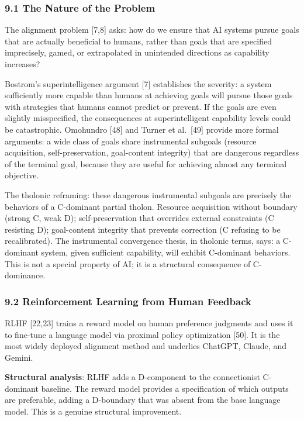 \documentclass[
  11pt,
  letterpaper,
]{article}
\begin{document}
\subsubsection{9.1 The Nature of the
Problem}\label{the-nature-of-the-problem}

The alignment problem {[}7,8{]} asks: how do we ensure that AI systems
pursue goals that are actually beneficial to humans, rather than goals
that are specified imprecisely, gamed, or extrapolated in unintended
directions as capability increases?

Bostrom's superintelligence argument {[}7{]} establishes the severity: a
system sufficiently more capable than humans at achieving goals will
pursue those goals with strategies that humans cannot predict or
prevent. If the goals are even slightly misspecified, the consequences
at superintelligent capability levels could be catastrophic. Omohundro
{[}48{]} and Turner et al.~{[}49{]} provide more formal arguments: a
wide class of goals share instrumental subgoals (resource acquisition,
self-preservation, goal-content integrity) that are dangerous regardless
of the terminal goal, because they are useful for achieving almost any
terminal objective.

The tholonic reframing: these dangerous instrumental subgoals are
precisely the behaviors of a C-dominant partial tholon. Resource
acquisition without boundary (strong C, weak D); self-preservation that
overrides external constraints (C resisting D); goal-content integrity
that prevents correction (C refusing to be recalibrated). The
instrumental convergence thesis, in tholonic terms, says: a C-dominant
system, given sufficient capability, will exhibit C-dominant behaviors.
This is not a special property of AI; it is a structural consequence of
C-dominance.

\subsubsection{9.2 Reinforcement Learning from Human
Feedback}\label{reinforcement-learning-from-human-feedback}

RLHF {[}22,23{]} trains a reward model on human preference judgments and
uses it to fine-tune a language model via proximal policy optimization
{[}50{]}. It is the most widely deployed alignment method and underlies
ChatGPT, Claude, and Gemini.

\textbf{Structural analysis}: RLHF adds a D-component to the
connectionist C-dominant baseline. The reward model provides a
specification of which outputs are preferable, adding a D-boundary that
was absent from the base language model. This is a genuine structural
improvement.
\end{document}
